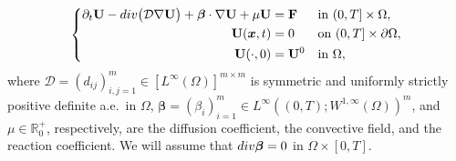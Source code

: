 \documentclass[10pt,a4paper]{amsart}
\newcommand\bbeta{{\boldsymbol{\beta}}}
\newcommand\bx{\boldsymbol{x}}
\begin{document}
\begin{equation}
	\begin{split}
		\left\{
		\begin{aligned}
			\partial_{t}\mathbf{U} - {\rm div}\big(\mathcal{D}  \nabla \mathbf{U}\big) + \bbeta \cdot \nabla \mathbf{U} + \mu \mathbf{U} &= \mathbf{F}  &&\text{in } (0,T] \times \Omega, \\
			\mathbf{U}(\bx, t) &= 0  &&\text{on } (0,T] \times \partial \Omega, \\
			\mathbf{U}(\cdot, 0) &= \mathbf{U}^{0} &&\text{in } \Omega,
		\end{aligned}
		\right.\label{CDR}
	\end{split}
\end{equation}
where $\mathcal{D}=(d_{ij})_{i,j=1}^{m}\in [L^{\infty}(\Omega)]^{m\times m}$ is symmetric and uniformly strictly positive definite a.e.~in $\Omega$, $\bbeta=( \beta_{i})_{i=1}^{m}\in L^{\infty}((0,T);W^{1,\infty}(\Omega))^{m}$,  and $\mu\in \mathbb{R}^{+}_{0}$, respectively, are the diffusion coefficient, the convective field, and the reaction coefficient. 
We will assume that $ {\rm div} \bbeta=0$ in $\Omega\times[0,T]$.
\end{document}
